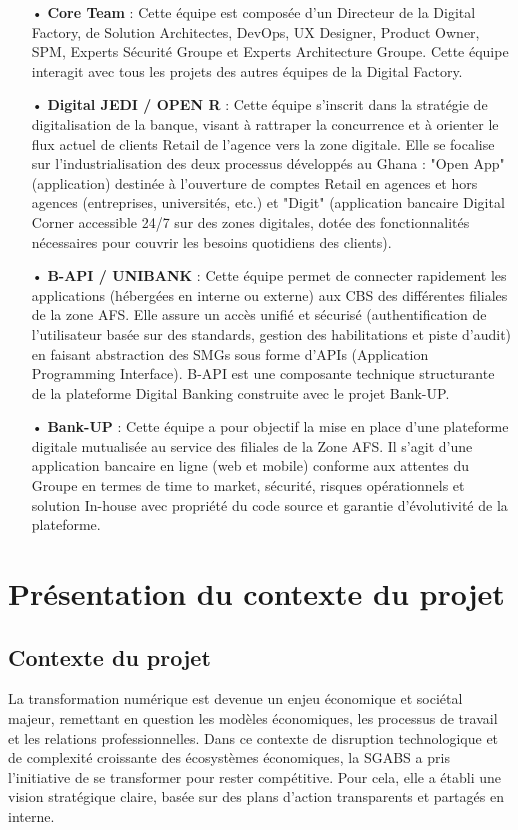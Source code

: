 \begin{itemize}
    \item[•] \textbf{Core Team} : Cette équipe est composée d'un Directeur de la Digital Factory, de Solution Architectes, DevOps, UX Designer, Product Owner, SPM, Experts Sécurité Groupe et Experts Architecture Groupe. Cette équipe interagit avec tous les projets des autres équipes de la Digital Factory.
    \item[•] \textbf{Digital JEDI / OPEN R} : Cette équipe s'inscrit dans la stratégie de digitalisation de la banque, visant à rattraper la concurrence et à orienter le flux actuel de clients Retail de l'agence vers la zone digitale. Elle se focalise sur l'industrialisation des deux processus développés au Ghana : "Open App" (application) destinée à l'ouverture de comptes Retail en agences et hors agences (entreprises, universités, etc.) et "Digit" (application bancaire Digital Corner accessible 24/7 sur des zones digitales, dotée des fonctionnalités nécessaires pour couvrir les besoins quotidiens des clients).
    \item[•] \textbf{B-API / UNIBANK} : Cette équipe permet de connecter rapidement les applications (hébergées en interne ou externe) aux CBS des différentes filiales de la zone AFS. Elle assure un accès unifié et sécurisé (authentification de l'utilisateur basée sur des standards, gestion des habilitations et piste d'audit) en faisant abstraction des SMGs sous forme d'APIs (Application Programming Interface). B-API est une composante technique structurante de la plateforme Digital Banking construite avec le projet Bank-UP.
    \item[•] \textbf{Bank-UP} : Cette équipe a pour objectif la mise en place d'une plateforme digitale mutualisée au service des filiales de la Zone AFS. Il s'agit d'une application bancaire en ligne (web et mobile) conforme aux attentes du Groupe en termes de time to market, sécurité, risques opérationnels et solution In-house avec propriété du code source et garantie d'évolutivité de la plateforme.\\
\end{itemize}

\section{Présentation du contexte du projet }
\subsection{Contexte du projet}
La transformation numérique est devenue un enjeu économique et sociétal majeur, remettant en question les modèles économiques, les processus de travail et les relations professionnelles. Dans ce contexte de disruption technologique et de complexité croissante des écosystèmes économiques, la SGABS a pris l'initiative de se transformer pour rester compétitive. Pour cela, elle a établi une vision stratégique claire, basée sur des plans d'action transparents et partagés en interne.\\

